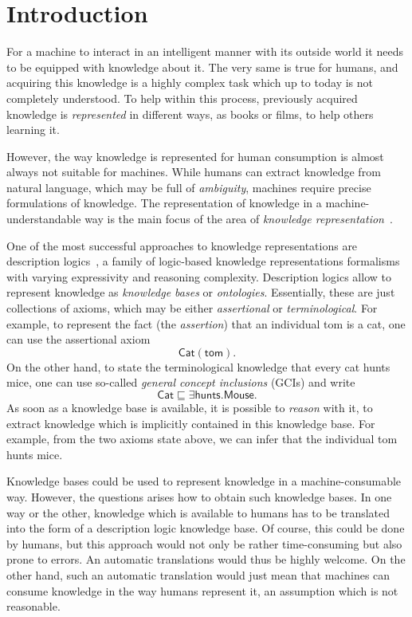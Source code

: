 \chapter{Introduction}
\label{cha:introduction}

For a machine to interact in an intelligent manner with its outside world it needs to be
equipped with knowledge about it.  The very same is true for humans, and acquiring this
knowledge is a highly complex task which up to today is not completely understood.  To
help within this process, previously acquired knowledge is \emph{represented} in different
ways, \eg as books or films, to help others learning it.

However, the way knowledge is represented for human consumption is almost always not
suitable for machines.  While humans can extract knowledge from natural language, which
may be full of \emph{ambiguity}, machines require precise formulations of knowledge.  The
representation of knowledge in a machine-understandable way is the main focus of the area
of \emph{knowledge representation}~\cite{KRhandbook}.

One of the most successful approaches to knowledge representations are description
logics~\cite{DLhandbook}, a family of logic-based knowledge representations formalisms
with varying expressivity and reasoning complexity.  Description logics allow to represent
knowledge as \emph{knowledge bases} or \emph{ontologies}.  Essentially, these are just
collections of axioms, which may be either \emph{assertional} or \emph{terminological}.
For example, to represent the fact (the \emph{assertion}) that an individual \textsf{tom}
is a cat, one can use the assertional axiom
\begin{equation}
  \label{eq:14}
  \mathsf{Cat}(\mathsf{tom}).
\end{equation}
On the other hand, to state the terminological knowledge that every cat hunts mice, one
can use so-called \emph{general concept inclusions} (GCIs) and write
\begin{equation}
  \label{eq:15}
  \mathsf{Cat} \sqsubseteq \exists \mathsf{hunts}. \mathsf{Mouse}.
\end{equation}
As soon as a knowledge base is available, it is possible to \emph{reason} with it, \ie to
extract knowledge which is implicitly contained in this knowledge base.  For example, from
the two axioms state above, we can infer that the individual \textsf{tom} hunts mice.

Knowledge bases could be used to represent knowledge in a machine-consumable way.
However, the questions arises how to obtain such knowledge bases.  In one way or the
other, knowledge which is available to humans has to be translated into the form of a
description logic knowledge base.  Of course, this could be done by humans, but this
approach would not only be rather time-consuming but also prone to errors.  An automatic
translations would thus be highly welcome.  On the other hand, such an automatic
translation would just mean that machines can consume knowledge in the way humans
represent it, an assumption which is not reasonable.

